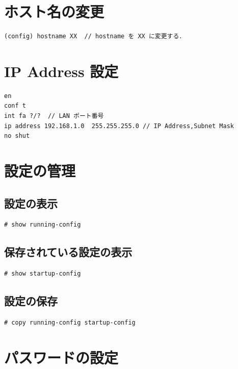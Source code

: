 \documentclass[uplatex,dvipdfmx]{bxjsarticle}
\begin{document}
\section{ホスト名の変更}

\begin{lstlisting}[caption={ホスト名の変更}]
(config) hostname XX  // hostname を XX に変更する．
\end{lstlisting}

\section{IP Address 設定}

\begin{lstlisting}[caption=IP Address Settings]
en
conf t
int fa ?/?  // LAN ポート番号
ip address 192.168.1.0  255.255.255.0 // IP Address,Subnet Mask
no shut
\end{lstlisting}

\section{設定の管理}

\subsection{設定の表示}

\begin{lstlisting}[caption={設定の表示}]
# show running-config
\end{lstlisting}

\subsection{保存されている設定の表示}

\begin{lstlisting}[caption={保存されている設定の表示}]
# show startup-config
\end{lstlisting}

\subsection{設定の保存}

\begin{lstlisting}[caption={設定の保存}]
# copy running-config startup-config
\end{lstlisting}

\section{パスワードの設定}
\end{document}

